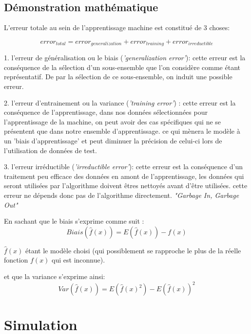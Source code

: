 \documentclass[a4paper]{article}
\begin{document}
\newpage

\subsection{Démonstration mathématique}

L'erreur totale au sein de l'apprentissage machine est constitué de 3 choses: \newline

\[ error_{total} = error_{generalization} + error_{training} + error_{irreductible} \]

1. l'erreur de généralisation ou le biais (\textit{'generalization error'}): cette erreur est la conséquence de la sélection d'un sous-ensemble que l'on considère comme étant représentatif. De par la sélection de ce sous-ensemble, on induit une possible erreur.\newline

2. l'erreur d'entrainement ou la variance (\textit{'training error'}) : cette erreur est la conséquence de l'apprentissage, dans nos données sélectionnées pour l'apprentissage de la machine, on peut avoir des cas spécifiques qui ne se présentent que dans notre ensemble d'apprentissage. ce qui mènera le modèle à un 'biais d'apprentissage' et peut diminuer la précision de celui-ci lors de l'utilisation de données de test.\newline

3. l'erreur irréductible (\textit{'irreductible error'}): cette erreur est la conséquence d'un traitement peu efficace des données en amont de l'apprentissage, les données qui seront utilisées par l'algorithme doivent êtres nettoyés avant d'être utilisées. cette erreur ne dépends donc pas de l'algorithme directement. \textit{"Garbage In, Garbage Out"}\newline


En sachant que le biais s'exprime comme suit : 
\[ Biais(\hat{f}(x)) = E(\hat{f}(x)) - f(x)\]

 $\hat{f}(x)$ étant le modèle choisi (qui possiblement se rapproche le plus de la réelle fonction $f(x)$ qui est inconnue).
 
 et que la variance s'exprime ainsi: 
 \[ Var(\hat{f}(x)) = E(\hat{f}(x)^2) - E(\hat{f}(x))^2 \]

\newpage

\section{Simulation}
\end{document}
